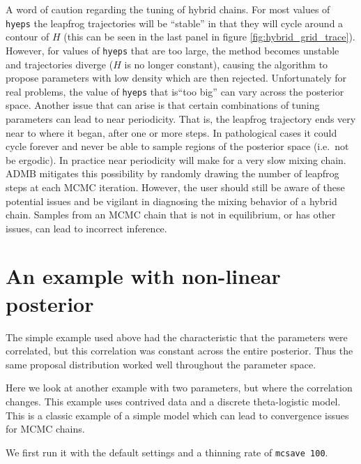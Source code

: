 \documentclass{article}\usepackage[]{graphicx}\usepackage[]{color}
\begin{document}
A word of caution regarding the tuning of hybrid chains. For
most values of \texttt{hyeps} the leapfrog trajectories will
be ``stable'' in that they will cycle around a contour of
$H$ (this can be seen in the last panel in figure
\ref{fig:hybrid_grid_trace}). However, for values of
\texttt{hyeps} that are too large, the method becomes
unstable and trajectories diverge ($H$ is no longer
constant), causing the algorithm to propose parameters with
low density which are then rejected. Unfortunately for real
problems, the value of \texttt{hyeps} that is``too big'' can
vary across the posterior space.  Another issue that can
arise is that certain combinations of tuning parameters can
lead to near periodicity. That is, the leapfrog trajectory
ends very near to where it began, after one or more
steps. In pathological cases it could cycle forever and
never be able to sample regions of the posterior space
(i.e.\ not be ergodic). In practice near periodicity will
make for a very slow mixing chain. ADMB mitigates this
possibility by randomly drawing the number of leapfrog steps
at each MCMC iteration. However, the user should still be
aware of these potential issues and be vigilant in
diagnosing the mixing behavior of a hybrid chain. Samples
from an MCMC chain that is not in equilibrium, or has other
issues, can lead to incorrect inference.

\section{An example with non-linear posterior}
The simple example used above had the characteristic that
the parameters were correlated, but this correlation was
constant across the entire posterior. Thus the same proposal
distribution worked well throughout the parameter space.

Here we look at another example with two parameters, but
where the correlation changes. This example uses contrived
data and a discrete theta-logistic model. This is a classic
example of a simple model which can lead to convergence
issues for MCMC chains.

We first run it with the default settings and a thinning
rate of \texttt{mcsave 100}.
\end{document}
